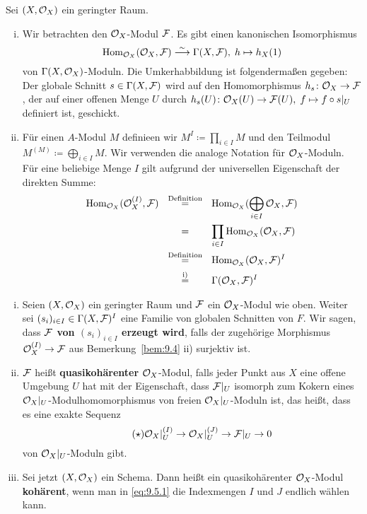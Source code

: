 \begin{bem}
\label{bem:9.4}
	Sei $(X,\mathcal{O}_X)$ ein geringter Raum.
	\begin{enumerate}[i)]
		\item Wir betrachten den $\mathcal{O}_X$-Modul $\mathcal{F}$. Es gibt einen kanonischen Isomorphismus
		\[
			\operatorname{Hom}_{\mathcal{O}_X}(\mathcal{O}_X,\mathcal{F}) \overset{\sim}{\longrightarrow} \Gamma(X,\mathcal{F}),\; h \mapsto h_X(1)
		\]
		von $\Gamma(X,\mathcal{O}_X)$-Moduln. Die Umkerhabbildung ist folgendermaßen gegeben: Der globale Schnitt $s \in \Gamma(X,\mathcal{F})$ wird auf den Homomorphismus $h_s\colon \mathcal{O}_X \to \mathcal{F}$, der auf einer offenen Menge $U$ durch $h_s(U)\colon \mathcal{O}_X(U) \to \mathcal{F}(U),\; f \mapsto f \circ s\vert_U$ definiert ist, geschickt.
		\item Für einen $A$-Modul $M$ definieen wir $M^I \coloneqq \prod_{i\in I}M$ und den Teilmodul $M^{(M)} \coloneqq \bigoplus_{i\in I} M$. Wir verwenden die analoge Notation für $\mathcal{O}_X$-Moduln. Für eine beliebige Menge $I$ gilt aufgrund der universellen Eigenschaft der direkten Summe:
		\begin{align*}
			\Hom_{\mco_X}(\mco_X^{(I)},\mcf) \qquad &\overset{\mathclap{\text{Definition}}}{=} \qquad \Hom_{\mco_X}(\bigoplus_{i\in I}\mco_X,\mcf)\\
			&= \qquad \prod_{i\in I} \Hom_{\mco_X}(\mco_X,\mcf)\\
			&\overset{\mathclap{\text{Definition}}}{=} \qquad \Hom_{\mco_X}(\mco_X,\mcf)^I\\
			&\overset{\text{i)}}{=} \qquad \Gamma(\mco_X,\mcf)^I
		\end{align*}	 
	\end{enumerate}
\end{bem}

\begin{defn}
\label{defn:9.5}
	\begin{enumerate}[i)]
		\item Seien $(X,\mathcal{O}_X)$ ein geringter Raum und $\mathcal{F}$ ein $\mathcal{O}_X$-Modul wie oben. Weiter sei $(s_i)_{i\in I}\in \Gamma(X,\mathcal{F})^I$ eine Familie von globalen Schnitten von $F$. Wir sagen, dass \textbf{$\mathcal{F}$ von $(s_i)_{i\in I}$ erzeugt wird}, falls der zugehörige Morphismus $\mathcal{O}_X^{(I)}\to \mathcal{F}$ aus Bemerkung~\ref{bem:9.4} ii) surjektiv ist.
		\item $\mathcal{F}$ heißt \textbf{quasikohärenter} $\mathcal{O}_X$-Modul, falls jeder Punkt aus $X$ eine offene Umgebung $U$ hat mit der Eigenschaft, dass $\mathcal{F}\vert_U$ isomorph zum Kokern eines $\mathcal{O}_X\vert_U$-Modulhomomorphismus von freien $\mathcal{O}_X\vert_U$-Moduln ist, das heißt, dass es eine exakte Sequenz
		\begin{equation*}
		\label{eq:9.5.1}\tag{$\star$}
			\mathcal{O}_X\vert_U^{(I)} \to \mathcal{O}_X\vert_U^{(J)} \to \mathcal{F}\vert_U \to 0
		\end{equation*}
		von $\mathcal{O}_X\vert_U$-Moduln gibt.
		\item Sei jetzt $(X,\mathcal{O}_X)$ ein Schema. Dann heißt ein quasikohärenter $\mathcal{O}_X$-Modul \textbf{kohärent}, wenn man in \eqref{eq:9.5.1} die Indexmengen $I$ und $J$ endlich wählen kann.
	\end{enumerate}
\end{defn}


